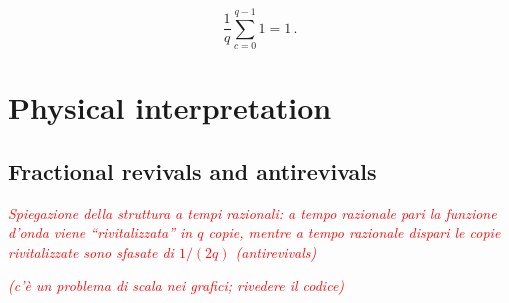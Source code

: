 \documentclass{article}
\newcommand{\T}{\ensuremath{\vartheta}}
\newcommand{\cmnt}[1]{\textcolor{red}{\emph{#1}}}
\newcommand{\sumZ}{\sum_{n=-\infty}^{\infty}}
\newcommand{\immagine}[4]{
    \begin{figure}[h]
    \centering{
    \def\svgwidth{\linewidth}
    {}
    \caption{#3}
    \label{fig:#4}
    }
    \end{figure}
}
\begin{document}
\begin{equation}
    \frac{1}{q}\sum_{c=0}^{q-1} 1 = 1\,.
\end{equation}

%
%
%
%
%


\section{Physical interpretation}

\subsection{Fractional revivals and antirevivals}

\cmnt{Spiegazione della struttura a tempi razionali: a tempo razionale pari la funzione d'onda viene ``rivitalizzata'' in $q$ copie, mentre a tempo razionale dispari le copie rivitalizzate sono sfasate di $1/(2q)$ (antirevivals)}











\cmnt{(c'è un problema di scala nei grafici; rivedere il codice)}


\printbibliography
\end{document}
